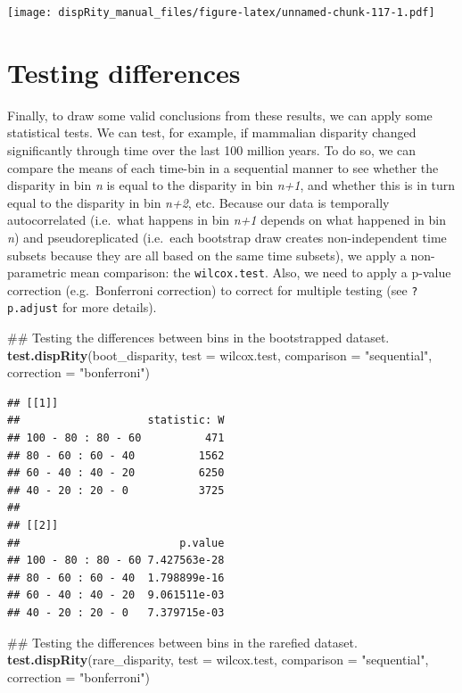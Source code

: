 \documentclass[]{book}
\newenvironment{Shaded}{\begin{snugshade}}{\end{snugshade}}
\newcommand{\KeywordTok}[1]{\textcolor[rgb]{0.13,0.29,0.53}{\textbf{#1}}}
\newcommand{\DataTypeTok}[1]{\textcolor[rgb]{0.13,0.29,0.53}{#1}}
\newcommand{\StringTok}[1]{\textcolor[rgb]{0.31,0.60,0.02}{#1}}
\newcommand{\NormalTok}[1]{#1}
\theoremstyle{definition}
\theoremstyle{definition}
\theoremstyle{definition}
\theoremstyle{remark}
\begin{document}
\texttt{[image: dispRity\_manual\_files/figure-latex/unnamed-chunk-117-1.pdf]}

\section{Testing differences}\label{testing-differences}

Finally, to draw some valid conclusions from these results, we can apply
some statistical tests. We can test, for example, if mammalian disparity
changed significantly through time over the last 100 million years. To
do so, we can compare the means of each time-bin in a sequential manner
to see whether the disparity in bin \emph{n} is equal to the disparity
in bin \emph{n+1}, and whether this is in turn equal to the disparity in
bin \emph{n+2}, etc. Because our data is temporally autocorrelated
(i.e.~what happens in bin \emph{n+1} depends on what happened in bin
\emph{n}) and pseudoreplicated (i.e.~each bootstrap draw creates
non-independent time subsets because they are all based on the same time
subsets), we apply a non-parametric mean comparison: the
\texttt{wilcox.test}. Also, we need to apply a p-value correction
(e.g.~Bonferroni correction) to correct for multiple testing (see
\texttt{?p.adjust} for more details).

\begin{Shaded}
\begin{Highlighting}[]
\NormalTok{## Testing the differences between bins in the bootstrapped dataset.}
\KeywordTok{test.dispRity}\NormalTok{(boot_disparity, }\DataTypeTok{test =}\NormalTok{ wilcox.test, }\DataTypeTok{comparison =} \StringTok{"sequential"}\NormalTok{,}
    \DataTypeTok{correction =} \StringTok{"bonferroni"}\NormalTok{)}
\end{Highlighting}
\end{Shaded}

\begin{verbatim}
## [[1]]
##                    statistic: W
## 100 - 80 : 80 - 60          471
## 80 - 60 : 60 - 40          1562
## 60 - 40 : 40 - 20          6250
## 40 - 20 : 20 - 0           3725
## 
## [[2]]
##                         p.value
## 100 - 80 : 80 - 60 7.427563e-28
## 80 - 60 : 60 - 40  1.798899e-16
## 60 - 40 : 40 - 20  9.061511e-03
## 40 - 20 : 20 - 0   7.379715e-03
\end{verbatim}

\begin{Shaded}
\begin{Highlighting}[]
\NormalTok{## Testing the differences between bins in the rarefied dataset.}
\KeywordTok{test.dispRity}\NormalTok{(rare_disparity, }\DataTypeTok{test =}\NormalTok{ wilcox.test, }\DataTypeTok{comparison =} \StringTok{"sequential"}\NormalTok{,}
    \DataTypeTok{correction =} \StringTok{"bonferroni"}\NormalTok{)}
\end{Highlighting}
\end{Shaded}
\end{document}
